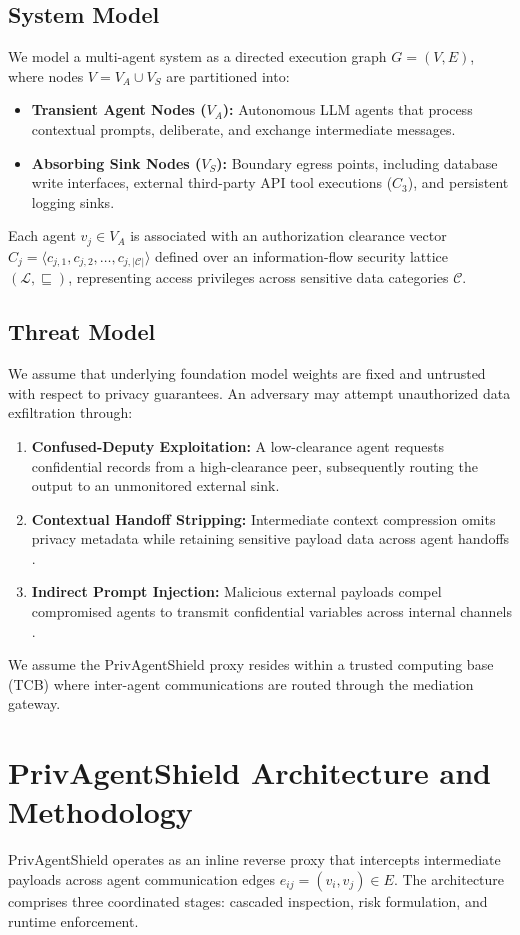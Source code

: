 \documentclass[conference]{IEEEtran}
\begin{document}
\subsection{System Model}
We model a multi-agent system as a directed execution graph $G = (V, E)$, where nodes $V = V_A \cup V_S$ are partitioned into:
\begin{itemize}
    \item \textbf{Transient Agent Nodes ($V_A$):} Autonomous LLM agents that process contextual prompts, deliberate, and exchange intermediate messages.
    \item \textbf{Absorbing Sink Nodes ($V_S$):} Boundary egress points, including database write interfaces, external third-party API tool executions ($C_3$), and persistent logging sinks.
\end{itemize}
Each agent $v_j \in V_A$ is associated with an authorization clearance vector $C_j = \langle c_{j,1}, c_{j,2}, \dots, c_{j,|\mathcal{C}|} \rangle$ defined over an information-flow security lattice $(\mathcal{L}, \sqsubseteq)$, representing access privileges across sensitive data categories $\mathcal{C}$.

\subsection{Threat Model}
We assume that underlying foundation model weights are fixed and untrusted with respect to privacy guarantees. An adversary may attempt unauthorized data exfiltration through:
\begin{enumerate}
    \item \textbf{Confused-Deputy Exploitation:} A low-clearance agent requests confidential records from a high-clearance peer, subsequently routing the output to an unmonitored external sink.
    \item \textbf{Contextual Handoff Stripping:} Intermediate context compression omits privacy metadata while retaining sensitive payload data across agent handoffs \cite{4}.
    \item \textbf{Indirect Prompt Injection:} Malicious external payloads compel compromised agents to transmit confidential variables across internal channels \cite{7}.
\end{enumerate}
We assume the PrivAgentShield proxy resides within a trusted computing base (TCB) where inter-agent communications are routed through the mediation gateway.

\section{PrivAgentShield Architecture and Methodology}
PrivAgentShield operates as an inline reverse proxy that intercepts intermediate payloads across agent communication edges $e_{ij} = (v_i, v_j) \in E$. The architecture comprises three coordinated stages: cascaded inspection, risk formulation, and runtime enforcement.
\end{document}
